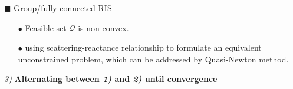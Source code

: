 \documentclass[paperwidth=841mm,paperheight=1300mm,portrait]{baposter}
\begin{document}
\begin{poster}
{\begin{itemize}
\begin{minipage}[c]{\textwidth/3}
        \end{minipage}
        \begin{minipage}[c]{\textwidth/2}
                $\blacksquare$ Group/fully connected RIS
                \begin{itemize}
                    \vspace{-2pt}\item[$\bullet$] Feasible set $\mathcal{Q}$ is non-convex.
                    \vspace{-2pt}\item[$\bullet$] using scattering-reactance relationship to formulate an equivalent unconstrained problem, which can be addressed by Quasi-Newton method.
                \end{itemize}  
        \end{minipage}
    \end{itemize}

\vspace{-2pt}
\emph{3)} \textbf{Alternating between \emph{1)} and \emph{2)} until convergence}
}


\end{poster}
\end{document}
